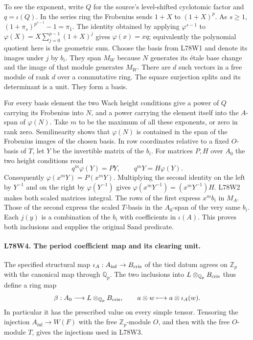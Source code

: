 To see the exponent, write $Q$ for the source's level-shifted
cyclotomic factor and $q=\iota(Q)$. In the series ring the Frobenius
sends $1+X$ to $(1+X)^p$. As $s\ge1$,
$(1+\pi_s)^{p^{s-1}}-1=\pi_1$.
The identity obtained by applying $\varphi^{s-1}$ to
$\varphi(X)=X\sum_{j=0}^{p-1}(1+X)^j$ gives $\varphi(x)=xq$;
equivalently the polynomial quotient here is the geometric sum.
Choose the basis from L78W1 and denote its images under $j$ by
$b_i$. They span $M_W$ because $N$ generates its \'etale base
change and the image of that module generates $M_W$. There are
$d$ such vectors in a free module of rank $d$ over a commutative
ring. The square surjection splits and its determinant is a unit.
They form a basis.

For every basis element the two Wach height conditions give a power
of $Q$ carrying its Frobenius into $N$, and a power carrying the
element itself into the $A$-span of $\varphi(N)$. Take $m$ to be the
maximum of all these exponents, or zero in rank zero. Semilinearity
shows that $\varphi(N)$ is contained in the span of the Frobenius
images of the chosen basis. In row coordinates relative to a fixed
$O$-basis of $T$, let $Y$ be the invertible matrix of the $b_i$.
For matrices $P,H$ over $A_0$ the two height conditions read
\[
 q^m\varphi(Y)=PY,\qquad q^mY=H\varphi(Y).
\]
Consequently $\varphi(x^mY)=P(x^mY)$. Multiplying the second
identity on the left by $Y^{-1}$ and on the right by
$\varphi(Y^{-1})$ gives
$\varphi(x^mY^{-1})=(x^mY^{-1})H$. L78W2 makes both scaled
matrices integral. The rows of the first express $x^mb_i$ in
$M_A$. Those of the second express the scaled $T$-basis in the
$A_0$-span of the very same $b_i$. Each $j(y)$ is a combination
of the $b_i$ with coefficients in $\iota(A)$. This proves both
inclusions and supplies the original $\mathrm{Sand}$ predicate.

\paragraph{L78W4. The period coefficient map and its clearing unit.}
The specified structural map $\iota_A:A_{\inf}\to B_{\rm cris}$
of the tied datum agrees on $\mathbb Z_p$ with the canonical map
through $\mathbb Q_p$. The two inclusions into $L\otimes_{\mathbb Q_p}
B_{\rm cris}$ thus define a ring map
\[
 \beta:A_0\longrightarrow L\otimes_{\mathbb Q_p}B_{\rm cris},
 \qquad a\otimes w\longmapsto a\otimes\iota_A(w).
\]
In particular it has the prescribed value on every simple tensor.
Tensoring the injection $A_{\inf}\to W(F)$ with the free
$\mathbb Z_p$-module $O$, and then with the free $O$-module $T$,
gives the injections used in L78W3.

